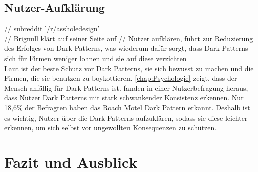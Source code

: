\documentclass[conference,compsoc,final,a4paper]{IEEEtran}
\begin{document}
\subsection{Nutzer-Aufklärung}
// subreddit '/r/assholedesign' \autocite{Chivukula_2019}\\
// Brignull klärt auf seiner Seite auf \autocite{Brignull}
// Nutzer aufklären, führt zur Reduzierung des Erfolges von Dark Patterns, was wiederum dafür sorgt, dass Dark Patterns sich für Firmen weniger lohnen und sie auf diese verzichten\\
Laut \citeauthor{Brignull} \autocite{Brignull} ist der beste Schutz vor Dark Patterns, sie sich bewusst zu machen und die Firmen, die sie benutzen zu boykottieren. \autoref{chap:Psychologie} zeigt, dass der Mensch anfällig für Dark Patterns ist. \citeauthor{M.Bhoot2020} \autocite{M.Bhoot2020} fanden in einer Nutzerbefragung heraus, dass Nutzer Dark Patterns mit stark schwankender Konsistenz erkennen. Nur 18,6\% der Befragten haben das Roach Motel Dark Pattern erkannt. Deshalb ist es wichtig, Nutzer über die Dark Patterns aufzuklären, sodass sie diese leichter erkennen, um sich selbst vor ungewollten Konsequenzen zu schützen.

\section{Fazit und Ausblick}

\nocite{*}
\printbibliography
\end{document}

